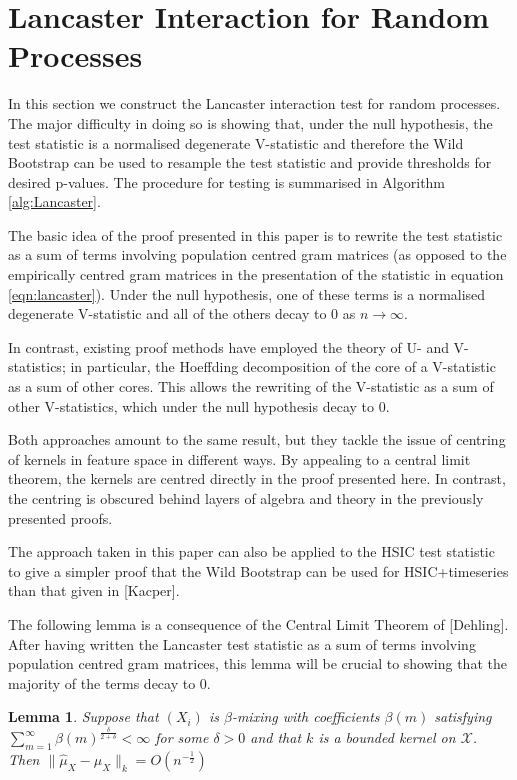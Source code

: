 \documentclass[]{article}
\newtheorem{lemma}{Lemma}
\begin{document}
\section{Lancaster Interaction for Random Processes}

In this section we construct the Lancaster interaction test for random processes. The major difficulty in doing so is showing that, under the null hypothesis, the test statistic is a normalised degenerate V-statistic and therefore the Wild Bootstrap can be used to resample the test statistic and provide thresholds for desired p-values. The procedure for testing is summarised in Algorithm \ref{alg:Lancaster}.

The basic idea of the proof presented in this paper is to rewrite the test statistic as a sum of terms involving population centred gram matrices (as opposed to the empirically centred gram matrices in the presentation of the statistic in equation \ref{eqn:lancaster}). Under the null hypothesis, one of these terms is a normalised degenerate V-statistic and all of the others decay to $0$ as $n \longrightarrow \infty$. 

In contrast, existing proof methods have employed the theory of U- and V-statistics; in particular, the Hoeffding decomposition of the core of a V-statistic as a sum of other cores. This allows the rewriting of the V-statistic as a sum of other V-statistics, which under the null hypothesis decay to 0.

Both approaches amount to the same result, but they tackle the issue of centring of kernels in feature space in different ways. By appealing to a central limit theorem, the kernels are centred directly in the proof presented here. In contrast, the centring is obscured behind layers of algebra and theory in the previously presented proofs.

The approach taken in this paper can also be applied to the HSIC test statistic to give a simpler proof that the Wild Bootstrap can be used for HSIC+timeseries than that given in [Kacper].

The following lemma is a consequence of the Central Limit Theorem of [Dehling]. After having written the Lancaster test statistic as a sum of terms involving population centred gram matrices, this lemma will be crucial to showing that the majority of the terms decay to 0.

\begin{lemma}\label{lemma:hilbertCLT}
Suppose that $(X_i)$ is $\beta$-mixing with coefficients $\beta(m)$ satisfying $\sum_{m=1}^{\infty}\beta(m)^{\frac{\delta}{2+\delta}}<\infty$ for some $\delta > 0$ and that $k$ is a bounded kernel on $\mathcal{X}$. Then $\|\hat\mu_X - \mu_X\|_k = O(n^{-\frac{1}{2}})$

\end{lemma}
\end{document}
